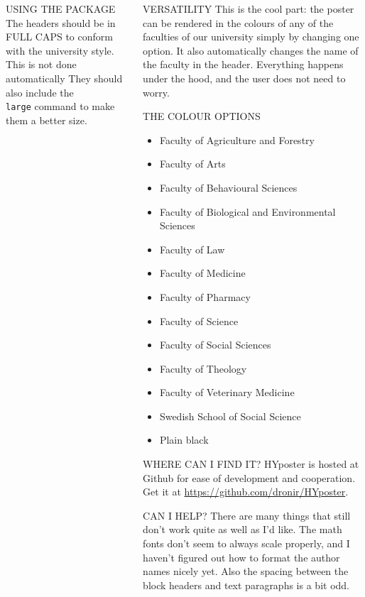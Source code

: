 \documentclass[final]{beamer}
\begin{document}
\begin{frame}[t, fragile]
\begin{columns}[T]
\begin{column}{0.32\linewidth}
\begin{block}{USING THE PACKAGE}
The headers should be in FULL CAPS to conform with the university style. This is not done automatically They should also include the \texttt{\\large} command to make them a better size.
\end{block}

\end{column}

\begin{column}{0.32\linewidth}

\begin{block}{VERSATILITY}
This is the cool part: the poster can be rendered in the colours of any of the faculties of our university simply by changing one option. It also automatically changes the name of the faculty in the header. Everything happens under the hood, and the user does not need to worry.
\end{block}

\begin{block}{THE COLOUR OPTIONS}
\begin{itemize}
\item Faculty of Agriculture and Forestry 
\item Faculty of Arts 
\item Faculty of Behavioural Sciences 
\item Faculty of Biological and Environmental Sciences 
\item Faculty of Law 
\item Faculty of Medicine 
\item Faculty of Pharmacy 
\item Faculty of Science 
\item Faculty of Social Sciences 
\item Faculty of Theology 
\item Faculty of Veterinary Medicine 
\item Swedish School of Social Science 
\item Plain black
\end{itemize}
\end{block}

\begin{block}{WHERE CAN I FIND IT?}
HYposter is hosted at Github for ease of development and cooperation. Get it at \url{https://github.com/dronir/HYposter}.
\end{block}


\begin{block}{CAN I HELP?}
There are many things that still don't work quite as well as I'd like. The math fonts don't seem to always scale properly, and I haven't figured out how to format the author names nicely yet. Also the spacing between the block headers and text paragraphs is a bit odd.


\end{block}
\end{column}
\end{columns}
\end{frame}
\end{document}

